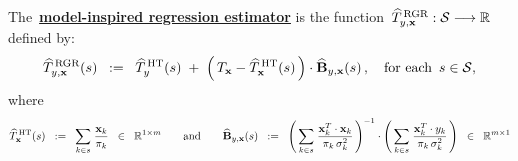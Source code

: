 \begin{definition}
The \,\underline{\textbf{model-inspired regression estimator}}\; is the function
\,$\widehat{T}^{\,\textnormal{RGR}}_{y,\mathbf{x}} : \mathcal{S} \longrightarrow \Re$\,
defined by:
\begin{equation*}
\widehat{T}^{\,\textnormal{RGR}}_{y,\mathbf{x}}(s)
\;\; := \;\;
	\widehat{T}^{\,\textnormal{HT}}_{y}(s)
	\; + \;
	\left(\,T_{\mathbf{x}} - \widehat{T}^{\,\textnormal{HT}}_{\mathbf{x}}(s) \,\right)
	\cdot
	\widehat{\mathbf{B}}_{y,\mathbf{x}}(s)\,,
	\quad\textnormal{for each \,$s \in \mathcal{S}$},
\end{equation*}
where
\begin{equation*}
\widehat{T}^{\,\textnormal{HT}}_{\mathbf{x}}(s)
\;\; := \;\;
	\underset{k \in s}{\sum}\;\dfrac{\mathbf{x}_{k}}{\pi_{k}}
	\;\; \in \;\;
	\Re^{1 \times m}
\quad\quad\textnormal{and}\quad\quad
\widehat{\mathbf{B}}_{y,\mathbf{x}}(s)
\;\; := \;\;
	\left(\,\underset{k \in s}{\sum}\;\dfrac{\mathbf{x}_{k}^{T} \cdot \mathbf{x}_{k}}{\pi_{k}\,\sigma_{k}^{2}} \,\right)^{-1}
	\cdot
	\left(\,\underset{k \in s}{\sum}\;\dfrac{\mathbf{x}_{k}^{T} \cdot y_{k}}{\pi_{k}\,\sigma_{k}^{2}} \,\right)
	\;\; \in \;\;
	\Re^{m \times 1}
\end{equation*}
\end{definition}


